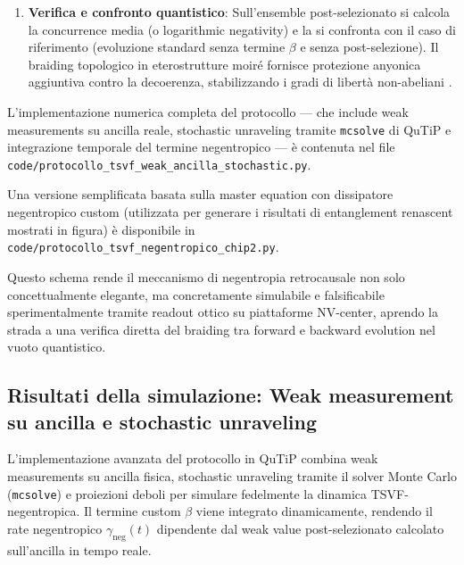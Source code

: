 \documentclass[11pt,a4paper]{article}
\let\oldcite\cite
\renewcommand{\cite}{\protect\oldcite}
\theoremstyle{plain}
\theoremstyle{definition}
\begin{document}
\begin{enumerate}
    \vspace{0.3cm}

    \item \textbf{Verifica e confronto quantistico}: Sull'ensemble post-selezionato si calcola la concurrence media (o logarithmic negativity) e la si confronta con il caso di riferimento (evoluzione standard senza termine \(\beta\) e senza post-selezione). Il braiding topologico in eterostrutture moiré fornisce protezione anyonica aggiuntiva contro la decoerenza, stabilizzando i gradi di libertà non-abeliani \cite{kong2016}.
\end{enumerate}


\vspace{0.4cm}

L'implementazione numerica completa del protocollo — che include weak measurements su ancilla reale, stochastic unraveling tramite \texttt{mcsolve} di QuTiP e integrazione temporale del termine negentropico — è contenuta nel file  
\texttt{code/protocollo\_tsvf\_weak\_ancilla\_stochastic.py}.  


\vspace{0.4cm}

Una versione semplificata basata sulla master equation con dissipatore negentropico custom (utilizzata per generare i risultati di entanglement renascent mostrati in figura) è disponibile in  
\texttt{code/protocollo\_tsvf\_negentropico\_chip2.py}.


\vspace{0.4cm}

Questo schema rende il meccanismo di negentropia retrocausale non solo concettualmente elegante, ma concretamente simulabile e falsificabile sperimentalmente tramite readout ottico su piattaforme NV-center, aprendo la strada a una verifica diretta del braiding tra forward e backward evolution nel vuoto quantistico.










\subsection{Risultati della simulazione: Weak measurement su ancilla e stochastic unraveling}

L'implementazione avanzata del protocollo in QuTiP combina weak measurements su ancilla fisica, stochastic unraveling tramite il solver Monte Carlo (\texttt{mcsolve}) e proiezioni deboli per simulare fedelmente la dinamica TSVF-negentropica. Il termine custom \(\beta\) viene integrato dinamicamente, rendendo il rate negentropico \(\gamma_{\text{neg}}(t)\) dipendente dal weak value post-selezionato calcolato sull'ancilla in tempo reale.
\end{document}

